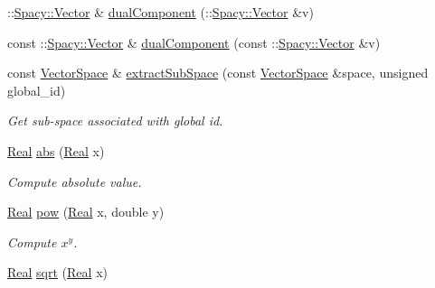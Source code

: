 \begin{DoxyCompactItemize}
\-::\hyperlink{classSpacy_1_1Vector}{\-Spacy\-::\-Vector} \& \hyperlink{group__ProductSpaceGroup_gafe51c084e3b03205db94e91309e834f7}{dual\-Component} (\-::\hyperlink{classSpacy_1_1Vector}{\-Spacy\-::\-Vector} \&v)
\item 
const \-::\hyperlink{classSpacy_1_1Vector}{\-Spacy\-::\-Vector} \& \hyperlink{group__ProductSpaceGroup_gabe5978657aab46b1575e2521b336407d}{dual\-Component} (const \-::\hyperlink{classSpacy_1_1Vector}{\-Spacy\-::\-Vector} \&v)
\item 
\hypertarget{group__ProductSpaceGroup_ga6054e5c78652ac4959f5d521acadd86a}{const \hyperlink{classSpacy_1_1VectorSpace}{\-Vector\-Space} \& \hyperlink{group__ProductSpaceGroup_ga6054e5c78652ac4959f5d521acadd86a}{extract\-Sub\-Space} (const \hyperlink{classSpacy_1_1VectorSpace}{\-Vector\-Space} \&space, unsigned global\-\_\-id)}\label{group__ProductSpaceGroup_ga6054e5c78652ac4959f5d521acadd86a}

\begin{DoxyCompactList}\small\item\em \-Get sub-\/space associated with global id. \end{DoxyCompactList}\item 
\hypertarget{namespaceSpacy_a89ed08f6f5a05e3f35afa37fcebf4b06}{\hyperlink{classSpacy_1_1Real}{\-Real} \hyperlink{namespaceSpacy_a89ed08f6f5a05e3f35afa37fcebf4b06}{abs} (\hyperlink{classSpacy_1_1Real}{\-Real} x)}\label{namespaceSpacy_a89ed08f6f5a05e3f35afa37fcebf4b06}

\begin{DoxyCompactList}\small\item\em \-Compute absolute value. \end{DoxyCompactList}\item 
\hypertarget{namespaceSpacy_acffef7eb409609abe7ad87aaad28503f}{\hyperlink{classSpacy_1_1Real}{\-Real} \hyperlink{namespaceSpacy_acffef7eb409609abe7ad87aaad28503f}{pow} (\hyperlink{classSpacy_1_1Real}{\-Real} x, double y)}\label{namespaceSpacy_acffef7eb409609abe7ad87aaad28503f}

\begin{DoxyCompactList}\small\item\em \-Compute $x^y$. \end{DoxyCompactList}\item 
\hypertarget{namespaceSpacy_aa779bb3e2bf547cd0ed9ef47b3d711a3}{\hyperlink{classSpacy_1_1Real}{\-Real} \hyperlink{namespaceSpacy_aa779bb3e2bf547cd0ed9ef47b3d711a3}{sqrt} (\hyperlink{classSpacy_1_1Real}{\-Real} x)}\label{namespaceSpacy_aa779bb3e2bf547cd0ed9ef47b3d711a3}


\end{DoxyCompactItemize}
